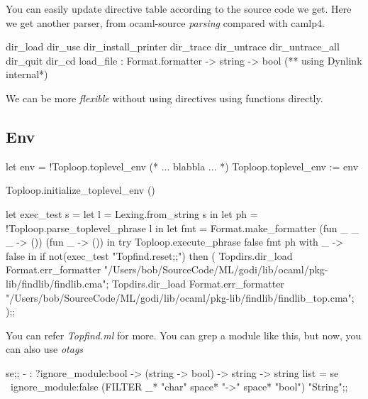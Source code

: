 You can easily update directive table according to the source code we
get. Here we get another parser, from ocaml-source \textit{parsing}
compared with camlp4.

\begin{ocamlcode}
  dir_load
  dir_use
  dir_install_printer
  dir_trace
  dir_untrace
  dir_untrace_all
  dir_quit
  dir_cd 
  load_file : Format.formatter -> string -> bool  (** using Dynlink internal*)
\end{ocamlcode}
We can be more \textit{flexible} without using directives using functions directly.


\subsection{Env}

  \begin{ocamlcode}
    let env = !Toploop.toplevel_env
    (* ... blabbla ...     *)
    Toploop.toplevel_env := env  
  \end{ocamlcode}
  
  \begin{ocamlcode}
    Toploop.initialize_toplevel_env ()  
  \end{ocamlcode}


\begin{ocamlcode}
let exec_test s =
  let l = Lexing.from_string s in
  let ph = !Toploop.parse_toplevel_phrase l in
  let fmt = Format.make_formatter (fun _ _ _ -> ()) (fun _ -> ()) in
  try
    Toploop.execute_phrase false fmt ph
  with
      _ -> false
in
if not(exec_test "Topfind.reset;;") then (
  Topdirs.dir_load Format.err_formatter "/Users/bob/SourceCode/ML/godi/lib/ocaml/pkg-lib/findlib/findlib.cma";
  Topdirs.dir_load Format.err_formatter "/Users/bob/SourceCode/ML/godi/lib/ocaml/pkg-lib/findlib/findlib_top.cma";
);;
\end{ocamlcode}
    
You can refer \textit{Topfind.ml} for more. You can grep a module like
this, but now, you can also use \textit{otags}

\begin{ocamlcode}
se;;
- : ?ignore_module:bool -> (string -> bool) -> string -> string list =
se ~ignore_module:false (FILTER _*  "char" space* "->" space* "bool") "String";;
\end{ocamlcode}

